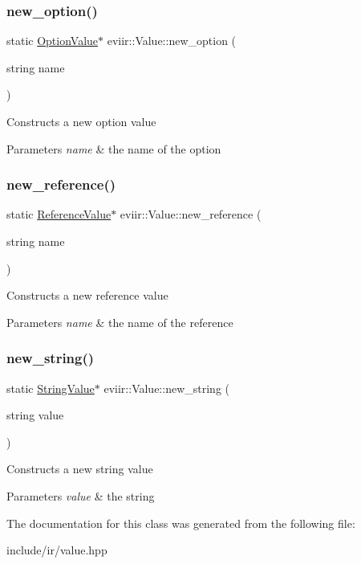 \subsubsection{\texorpdfstring{new\+\_\+option()}{new\_option()}}
{\footnotesize\ttfamily static \hyperlink{classeviir_1_1OptionValue}{Option\+Value}$\ast$ eviir\+::\+Value\+::new\+\_\+option (\begin{DoxyParamCaption}\item[{string}]{name }\end{DoxyParamCaption})\hspace{0.3cm}{\ttfamily [static]}}

Constructs a new option value 
\begin{DoxyParams}{Parameters}
{\em name} & the name of the option \\
\hline
\end{DoxyParams}
\mbox{\label{classeviir_1_1Value_ae74ab52631f7ca2289a3b7c66f36a2c7}} 
\subsubsection{\texorpdfstring{new\+\_\+reference()}{new\_reference()}}
{\footnotesize\ttfamily static \hyperlink{classeviir_1_1ReferenceValue}{Reference\+Value}$\ast$ eviir\+::\+Value\+::new\+\_\+reference (\begin{DoxyParamCaption}\item[{string}]{name }\end{DoxyParamCaption})\hspace{0.3cm}{\ttfamily [static]}}

Constructs a new reference value 
\begin{DoxyParams}{Parameters}
{\em name} & the name of the reference \\
\hline
\end{DoxyParams}
\mbox{\label{classeviir_1_1Value_a78aff0da1e6cf71d2ecb26117b7479a8}} 
\subsubsection{\texorpdfstring{new\+\_\+string()}{new\_string()}}
{\footnotesize\ttfamily static \hyperlink{classeviir_1_1StringValue}{String\+Value}$\ast$ eviir\+::\+Value\+::new\+\_\+string (\begin{DoxyParamCaption}\item[{string}]{value }\end{DoxyParamCaption})\hspace{0.3cm}{\ttfamily [static]}}

Constructs a new string value 
\begin{DoxyParams}{Parameters}
{\em value} & the string \\
\hline
\end{DoxyParams}


The documentation for this class was generated from the following file\+:\begin{DoxyCompactItemize}
\item 
include/ir/value.\+hpp\end{DoxyCompactItemize}
